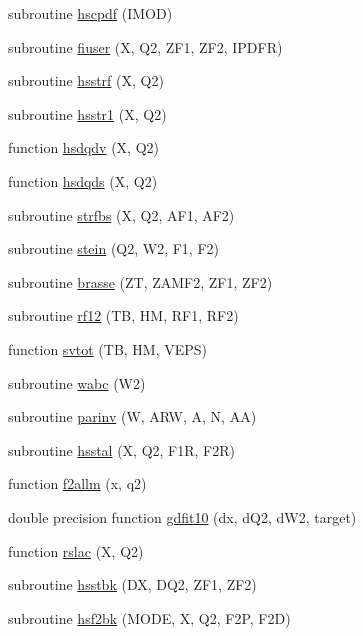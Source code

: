 \begin{DoxyCompactItemize}
subroutine \hyperlink{djangoh__h_8f_a948c29703e0ad618c41e77d47f6b9dcc}{hscpdf} (I\+M\+O\+D)
\item 
subroutine \hyperlink{djangoh__h_8f_a20cb4156b04afea506f1cd18fafff26d}{fiuser} (X, Q2, Z\+F1, Z\+F2, I\+P\+D\+F\+R)
\item 
subroutine \hyperlink{djangoh__h_8f_aec939475b71b9ae0e410cb2a51bfd50a}{hsstrf} (X, Q2)
\item 
subroutine \hyperlink{djangoh__h_8f_a5ea260f0282ee195444dff4b25214298}{hsstr1} (X, Q2)
\item 
function \hyperlink{djangoh__h_8f_a90e6b56cb0363038734c1691a486d526}{hsdqdv} (X, Q2)
\item 
function \hyperlink{djangoh__h_8f_ac5b04e0e69f49199fe393e884e650faf}{hsdqds} (X, Q2)
\item 
subroutine \hyperlink{djangoh__h_8f_ae61727f178ec63c92a8830afc984437e}{strfbs} (X, Q2, A\+F1, A\+F2)
\item 
subroutine \hyperlink{djangoh__h_8f_a4e8ef86cfe2f5d96120574725e66a516}{stein} (Q2, W2, F1, F2)
\item 
subroutine \hyperlink{djangoh__h_8f_a82cd345d495397e5870ba03c6ff3662c}{brasse} (Z\+T, Z\+A\+M\+F2, Z\+F1, Z\+F2)
\item 
subroutine \hyperlink{djangoh__h_8f_adc612a6379fe2bea9d4fc9539ea755fc}{rf12} (T\+B, H\+M, R\+F1, R\+F2)
\item 
function \hyperlink{djangoh__h_8f_a09c6d9f465f6389f731d46e6f94caae9}{svtot} (T\+B, H\+M, V\+E\+P\+S)
\item 
subroutine \hyperlink{djangoh__h_8f_a839e45a495af80840dd32630754982cf}{wabc} (W2)
\item 
subroutine \hyperlink{djangoh__h_8f_a425ded79ad99819b2a6ccace0358a5ef}{parinv} (W, A\+R\+W, A, N, A\+A)
\item 
subroutine \hyperlink{djangoh__h_8f_aee7150f7f29148fca4b6631da45d4ece}{hsstal} (X, Q2, F1\+R, F2\+R)
\item 
function \hyperlink{djangoh__h_8f_a1e585c73c2d45b50e390fbb6017e4668}{f2allm} (x, q2)
\item 
double precision function \hyperlink{djangoh__h_8f_aafdf2f8800c083262ef67339d17cf775}{gdfit10} (dx, d\+Q2, d\+W2, target)
\item 
function \hyperlink{djangoh__h_8f_aec68a28f044866c5570d11fc901c39f0}{rslac} (X, Q2)
\item 
subroutine \hyperlink{djangoh__h_8f_a82484cffd3d01a73064fd4603cfdd465}{hsstbk} (D\+X, D\+Q2, Z\+F1, Z\+F2)
\item 
subroutine \hyperlink{djangoh__h_8f_aca1a6c7455871ef113e38e782a2cb561}{hsf2bk} (M\+O\+D\+E, X, Q2, F2\+P, F2\+D)

\end{DoxyCompactItemize}
